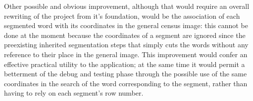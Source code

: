 Other possible and obvious improvement, although that  would require an overall rewriting of the project from it's foundation, would be the association of each segmented word with its coordinates in the general census image: this cannot be done at the moment because the coordinates of a segment are ignored since the preexisting inherited segmentation steps that simply cuts the words without any reference to their place in the general image.  
This improvement would confer an effective practical utility to the application; at the same time it would permit a betterment of the debug and testing phase through the possible use of the same coordinates in the search of the word corresponding to the segment, rather than having to rely on each segment's row number.
   
